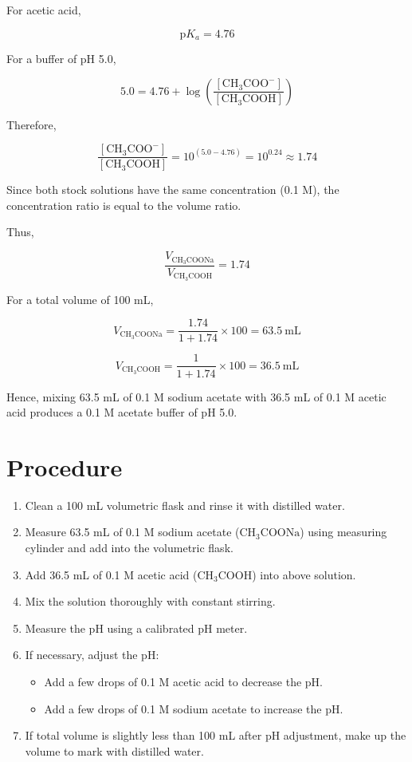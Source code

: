 \documentclass[12pt]{article}
\begin{document}
	For acetic acid,
	
	\[
	\mathrm{p}K_a=4.76
	\]
	
	For a buffer of pH 5.0,
	
	\[
	5.0=4.76+\log\left(\frac{[\mathrm{CH_3COO^-}]}{[\mathrm{CH_3COOH}]}\right)
	\]
	
	Therefore,
	
	\[
	\frac{[\mathrm{CH_3COO^-}]}{[\mathrm{CH_3COOH}]}
	=10^{(5.0-4.76)}
	=10^{0.24}
	\approx1.74
	\]
	
	Since both stock solutions have the same concentration (0.1 M), the concentration ratio is equal to the volume ratio.
	
	Thus,
	
	\[
	\frac{V_{\mathrm{CH_3COONa}}}
	{V_{\mathrm{CH_3COOH}}}
	=1.74
	\]
	
	For a total volume of 100 mL,
	
	\[
	V_{\mathrm{CH_3COONa}}
	=
	\frac{1.74}{1+1.74}\times100
	=
	63.5~\mathrm{mL}
	\]
	
	\[
	V_{\mathrm{CH_3COOH}}
	=
	\frac{1}{1+1.74}\times100
	=
	36.5~\mathrm{mL}
	\]
	
	Hence, mixing 63.5 mL of 0.1 M sodium acetate with 36.5 mL of 0.1 M acetic acid produces a 0.1 M acetate buffer of pH 5.0.
	
	\section*{Procedure}
	
	\begin{enumerate}
		\item Clean a 100 mL volumetric flask and rinse it with distilled water.
		\item Measure 63.5 mL of 0.1 M sodium acetate (\(\mathrm{CH_3COONa}\)) using measuring cylinder and add into the volumetric flask.
		\item Add 36.5 mL of 0.1 M acetic acid (\(\mathrm{CH_3COOH}\)) into above solution.
		\item Mix the solution thoroughly with constant stirring.
		\item Measure the pH using a calibrated pH meter.
		\item If necessary, adjust the pH:
		\begin{itemize}
			\item Add a few drops of 0.1 M acetic acid to decrease the pH.
			\item Add a few drops of 0.1 M sodium acetate to increase the pH.
		\end{itemize}
		\item If total volume is slightly less than 100 mL after pH adjustment, make up the volume to mark with distilled water.
	\end{enumerate}
	
\end{document}
